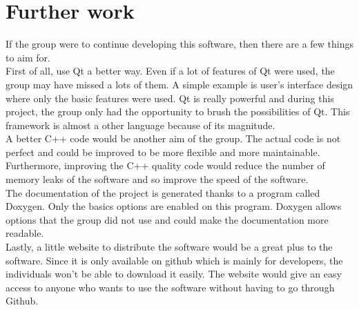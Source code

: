 \chapter{Further work}
If the group were to continue developing this software, then there are a few things to aim for.\\
First of all, use Qt a better way. Even if a lot of features of Qt were used, the group may have missed a lots of them. A simple example is user's interface design where only the basic features were used. Qt is really powerful and during this project, the group only had the opportunity to brush the possibilities of Qt. This framework is almost a other language because of its magnitude.\\
A better C++ code would be another aim of the group. The actual code is not perfect and could be improved to be more flexible and more maintainable. Furthermore, improving the C++ quality code would reduce the number of memory leaks of the software and so improve the speed of the software.\\
The documentation of the project is generated thanks to a program called Doxygen. Only the basics options are enabled on this program. Doxygen allows options that the group did not use and could make the documentation more readable.\\
Lastly, a little website to distribute the software would be a great plus to the software. Since it is only available on github which is mainly for developers, the individuals won't be able to download it easily. The website would give an easy access to anyone who wants to use the software without having to go through Github.\\